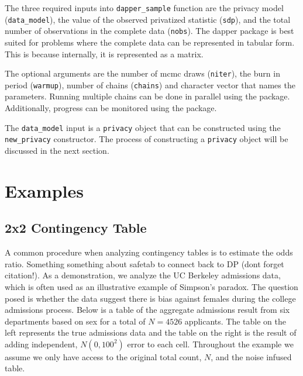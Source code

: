 The three required inputs into \texttt{dapper\_sample} function are the privacy model (\texttt{data\_model}), the value
of the observed privatized statistic (\texttt{sdp}), and the total number of observations
in the complete data (\texttt{nobs}). The dapper
package is best suited for problems where the complete data can be represented in
tabular form. This is because internally, it is represented as a matrix.

The optional arguments are the number of mcmc draws (\texttt{niter}), the
burn in period (\texttt{warmup}), number of chains (\texttt{chains}) and character
vector that names the parameters. Running multiple chains can be done in parallel
using the  package. Additionally, progress can be monitored
using the  package.

The \texttt{data\_model} input is a \texttt{privacy}
object that can be constructed using the \texttt{new\_privacy} constructor. The
process of constructing a \texttt{privacy} object will be discussed in the next section.

\hypertarget{examples}{%
\section{Examples}\label{examples}}

\hypertarget{x2-contingency-table}{%
\subsection{2x2 Contingency Table}\label{x2-contingency-table}}

A common procedure when analyzing contingency tables is to estimate the
odds ratio. Something something about safetab to connect back to DP (dont forget citation!).
As a demonstration, we analyze the UC Berkeley admissions data, which is often
used as an illustrative example of Simpson's paradox. The question posed is whether
the data suggest there is bias against females during the college admissions
process. Below is a table of the aggregate admissions result from six departments based on sex
for a total of \(N = 4526\) applicants. The table on the left represents
the true admissions data and the table on the right is the result of adding
independent, \(N(0,100^2)\) error to each cell. Throughout the example
we assume we only have access to the original total count, \(N\), and
the noise infused table.

